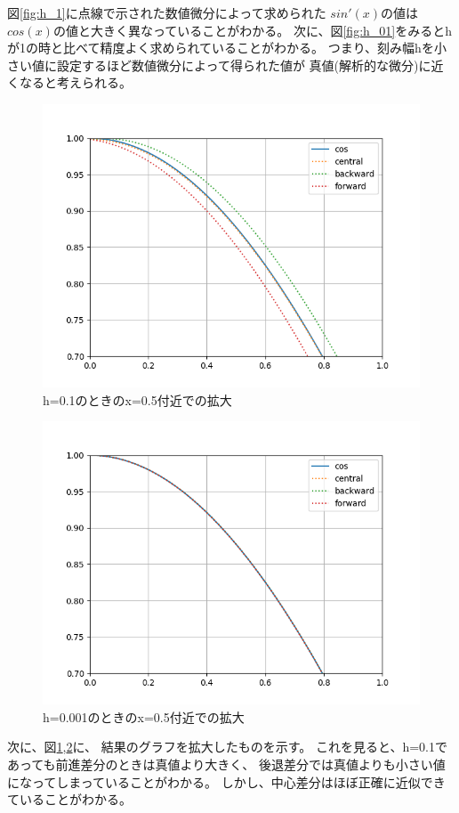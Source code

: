 \documentclass[dvipdfmx]{jsarticle}
\begin{document}
図\ref{fig:h_1}に点線で示された数値微分によって求められた
$sin'(x)$の値は$cos(x)$の値と大きく異なっていることがわかる。
次に、図\ref{fig:h_01}をみるとhが1の時と比べて精度よく求められていることがわかる。
つまり、刻み幅hを小さい値に設定するほど数値微分によって得られた値が
真値(解析的な微分)に近くなると考えられる。

\begin{figure}[htbp]
  \centering
  \includegraphics[width=0.7\hsize]{../pics/h=0_1_large.png}
  \caption{h=0.1のときのx=0.5付近での拡大}
  \label{fig:h_01_large}
\end{figure}

\begin{figure}[htbp]
  \centering
  \includegraphics[width=0.7\hsize]{../pics/h=0_001_large.png}
  \caption{h=0.001のときのx=0.5付近での拡大}
  \label{fig:h_0001_large}
\end{figure}

次に、図\ref{fig:h_01_large},\ref{fig:h_0001_large}に、
結果のグラフを拡大したものを示す。
これを見ると、h=0.1であっても前進差分のときは真値より大きく、
後退差分では真値よりも小さい値になってしまっていることがわかる。
しかし、中心差分はほぼ正確に近似できていることがわかる。
\end{document}
